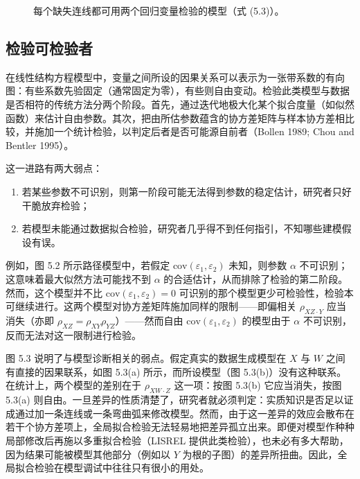 \begin{figure}[htbp]
\centering
{}
\caption{每个缺失连线都可用两个回归变量检验的模型（式 \textup{(5.3)}）。}
\label{fig:5.1}
\end{figure}

\subsection{检验可检验者}

在线性结构方程模型中，变量之间所设的因果关系可以表示为一张带系数的有向图：有些系数先验固定（通常固定为零），有些则自由变动。检验此类模型与数据是否相符的传统方法分两个阶段。首先，通过迭代地极大化某个拟合度量（如似然函数）来估计自由参数。其次，把由所估参数蕴含的协方差矩阵与样本协方差相比较，并施加一个统计检验，以判定后者是否可能源自前者（Bollen 1989; Chou and Bentler 1995）。

这一进路有两大弱点：

\begin{enumerate}[label=\arabic*.,leftmargin=1.8em]
\item 若某些参数不可识别，则第一阶段可能无法得到参数的稳定估计，研究者只好干脆放弃检验；
\item 若模型未能通过数据拟合检验，研究者几乎得不到任何指引，不知哪些建模假设有误。
\end{enumerate}

例如，图 5.2 所示路径模型中，若假定 $\mathrm{cov}(\varepsilon_1,\varepsilon_2)$ 未知，则参数 $\alpha$ 不可识别；这意味着最大似然方法可能找不到 $\alpha$ 的合适估计，从而排除了检验的第二阶段。然而，这个模型并不比 $\mathrm{cov}(\varepsilon_1,\varepsilon_2)=0$ 可识别的那个模型更少可检验性，检验本可继续进行。这两个模型对协方差矩阵施加同样的限制——即偏相关 $\rho_{XZ\cdot Y}$ 应当消失（亦即 $\rho_{XZ}=\rho_{XY}\rho_{YZ}$）——然而自由 $\mathrm{cov}(\varepsilon_1,\varepsilon_2)$ 的模型由于 $\alpha$ 不可识别，反而无法对这一限制进行检验。

图 5.3 说明了与模型诊断相关的弱点。假定真实的数据生成模型在 $X$ 与 $W$ 之间有直接的因果联系，如图 5.3(a) 所示，而所设模型（图 5.3(b)）没有这种联系。在统计上，两个模型的差别在于 $\rho_{XW\cdot Z}$ 这一项：按图 5.3(b) 它应当消失，按图 5.3(a) 则自由。一旦差异的性质清楚了，研究者就必须判定：实质知识是否足以证成通过加一条连线或一条弯曲弧来修改模型。然而，由于这一差异的效应会散布在若干个协方差项上，全局拟合检验无法轻易地把差异孤立出来。即便对模型作种种局部修改后再施以多重拟合检验（LISREL 提供此类检验），也未必有多大帮助，因为结果可能被模型其他部分（例如以 $Y$ 为根的子图）的差异所扭曲。因此，全局拟合检验在模型调试中往往只有很小的用处。


